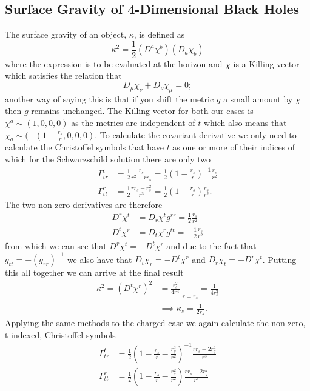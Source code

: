 \documentclass[12pt]{article}
\numberwithin{equation}{section}
\numberwithin{figure}{section}
\begin{document}
\subsection{Surface Gravity of 4-Dimensional Black Holes} %
\label{sub:surface_gravity_of_black_holes}
The surface gravity of an object, $\kappa$, is defined as 
\begin{equation}
	\kappa^2=\frac{1}{2}(D^a\chi^b)(D_a\chi_b)
\end{equation}
where the expression is to be evaluated at the horizon and $\chi$ is a Killing vector which satisfies the relation that
\begin{equation}
	D_{\mu}\chi_{\nu}+D_{\nu}\chi_{\mu}=0;
\end{equation}
another way of saying this is that if you shift the metric $g$ a small amount by $\chi$ then $g$ remains unchanged. The Killing vector for both our cases is $\chi^a \sim(1,0,0,0)$ as the metrics are independent of $t$ which also means that $\chi_a \sim (-(1-\frac{r_s}{r},0,0,0)$. To calculate the covariant derivative we only need to calculate the Christoffel symbols that have $t$ as one or more of their indices of which for the Schwarzschild solution there are only two
\begin{align}
\Gamma^{t}_{tr}&=\frac{1}{2}\frac{r_s}{r^2-rr_s}=\frac{1}{2}\left(1- \frac{r_s}{r}\right)^{-1}\frac{r_s}{r^2} \\
\Gamma^{r}_{tt}&=\frac{1}{2}\frac{rr_s-r_s^2}{r^3}=\frac{1}{2}\left(1- \frac{r_s}{r}\right)\frac{r_s}{r^2}.
\end{align}
The two non-zero derivatives are therefore
\begin{align}
D^r\chi^t&=D_r\chi^t g^{rr}=\frac{1}{2}\frac{r_s}{r^2}\\
D^t\chi^r&=D_t\chi^r g^{tt}=-\frac{1}{2}\frac{r_s}{r^2}
\end{align}
from which we can see that $D^r\chi^t=-D^t\chi^r$ and due to the fact that $g_{tt}=-(g_{rr})^{-1}$ we also have that $D_t\chi_r=-D^t\chi^r$ and $D_r\chi_t=-D^r\chi^t$. Putting this all together we can arrive at the final result
\begin{align}
	\kappa^2=(D^t\chi^r)^2&=\left. \frac{r_s^2}{4r^4}\right|_{r=r_s} = \frac{1}{4r_s^2}\\
	&\implies \kappa_s=\frac{1}{2r_s}.
\end{align}
Applying the same methods to the charged case we again calculate the non-zero, t-indexed, Christoffel symbols
\begin{align}
\Gamma^{t}_{tr}&=\frac{1}{2}\left(1- \frac{r_s}{r}- \frac{r_q^2}{r^2}\right)^{-1}\frac{rr_s-2r^2_q}{r^3} \\
\Gamma^{r}_{tt}&=\frac{1}{2}\left(1- \frac{r_s}{r}- \frac{r_q^2}{r^2}\right)\frac{rr_s-2r^2_q}{r^3}
\end{align}
\end{document}
